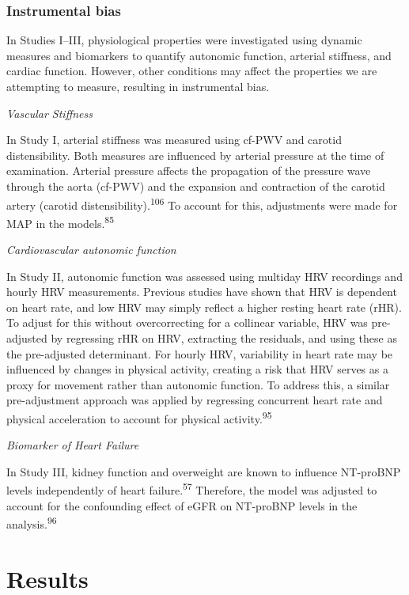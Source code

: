 \documentclass[
  a4paper,
  headsepline=true,
  open=left]{scrbook}
\begin{document}
\hypertarget{instrumental-bias}{%
\subsection{Instrumental bias}\label{instrumental-bias}}

In Studies I--III, physiological properties were investigated using
dynamic measures and biomarkers to quantify autonomic function, arterial
stiffness, and cardiac function. However, other conditions may affect
the properties we are attempting to measure, resulting in instrumental
bias.

\emph{Vascular Stiffness}

In Study I, arterial stiffness was measured using cf-PWV and carotid
distensibility. Both measures are influenced by arterial pressure at the
time of examination. Arterial pressure affects the propagation of the
pressure wave through the aorta (cf-PWV) and the expansion and
contraction of the carotid artery (carotid
distensibility).\textsuperscript{106} To account for this, adjustments
were made for MAP in the models.\textsuperscript{85}

\emph{Cardiovascular autonomic function}

In Study II, autonomic function was assessed using multiday HRV
recordings and hourly HRV measurements. Previous studies have shown that
HRV is dependent on heart rate, and low HRV may simply reflect a higher
resting heart rate (rHR). To adjust for this without overcorrecting for
a collinear variable, HRV was pre-adjusted by regressing rHR on HRV,
extracting the residuals, and using these as the pre-adjusted
determinant. For hourly HRV, variability in heart rate may be influenced
by changes in physical activity, creating a risk that HRV serves as a
proxy for movement rather than autonomic function. To address this, a
similar pre-adjustment approach was applied by regressing concurrent
heart rate and physical acceleration to account for physical
activity.\textsuperscript{95}

\emph{Biomarker of Heart Failure}

In Study III, kidney function and overweight are known to influence
NT-proBNP levels independently of heart failure.\textsuperscript{57}
Therefore, the model was adjusted to account for the confounding effect
of eGFR on NT-proBNP levels in the analysis.\textsuperscript{96}


\hypertarget{results}{%
\chapter{Results}\label{results}}
\end{document}

